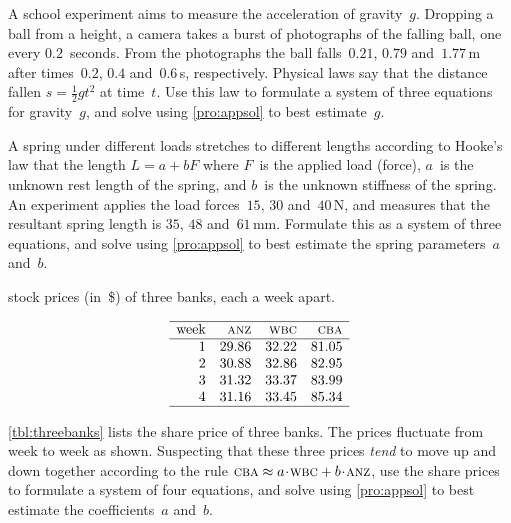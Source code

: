 \begin{exercise}  
A school experiment aims to measure the acceleration of gravity~\(g\).
Dropping a ball from a height, a camera takes a burst of photographs of the falling ball, one every \(0.2\)~seconds.
From the photographs the ball falls~\(0.21\), \(0.79\) and~\(1.77\)\,m after times~\(0.2\), \(0.4\) and~\(0.6\)\,s, respectively.
Physical laws say that the distance fallen \(s=\tfrac12gt^2\) at time~\(t\).
Use this law to formulate a system of three equations for gravity~\(g\), and solve using \cref{pro:appsol} to best estimate~\(g\).
\end{exercise}


\begin{exercise}  
A spring under different loads stretches to different lengths according to Hooke's law that the length \(L=a+bF\) where \(F\)~is the applied load (force), \(a\)~is the unknown rest length of the spring, and \(b\)~is the unknown stiffness of the spring.
An experiment applies the load forces~\(15\), \(30\) and~\(40\)\,N, and measures that the resultant spring length is \(35\), \(48\) and~\(61\)\,mm.
Formulate this as a system of three equations, and solve using \cref{pro:appsol} to best estimate the spring parameters~\(a\) and~\(b\).
\end{exercise}


\begin{exercise}  
\begin{table}
\caption{stock prices (in~\$) of three banks, each a week apart.}
\label{tbl:threebanks}
\begin{equation*}
\begin{array}{rrrr}
\hline
\text{week}&\textsc{anz}&\textsc{wbc}&\textsc{cba}
\\\hline
1&29.86&32.22&81.05\\
2&30.88&32.86&82.95\\
3&31.32&33.37&83.99\\
4&31.16&33.45&85.34\\
\hline
\end{array}
\end{equation*}
\end{table}
\cref{tbl:threebanks} lists the share price of three banks. 
The prices fluctuate from week to week as shown.
Suspecting that these three prices \emph{tend} to move up and down together according to the rule \(\textsc{cba}\approx a\cdot\textsc{wbc}+b\cdot\textsc{anz}\), use the share prices to formulate a system of four equations, and solve using \cref{pro:appsol} to best estimate the coefficients~\(a\) and~\(b\).
\end{exercise}





